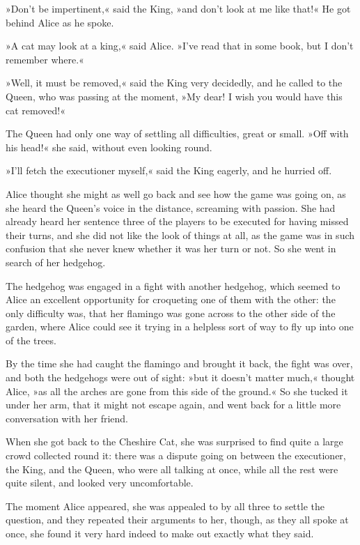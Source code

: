 »Don't be impertinent,« said the King, »and don't look at me like that!« He got behind Alice as he spoke.

»A cat may look at a king,« said Alice. »I've read that in some book, but I don't remember where.«

»Well, it must be removed,« said the King very decidedly, and he called to the Queen, who was passing at the moment, »My dear! I wish you would have this cat removed!«

The Queen had only one way of settling all difficulties, great or small. »Off with his head!« she said, without even looking round.

»I'll fetch the executioner myself,« said the King eagerly, and he hurried off.

Alice thought she might as well go back and see how the game was going on, as she heard the Queen's voice in the distance, screaming with passion. She had already heard her sentence three of the players to be executed for having missed their turns, and she did not like the look of things at all, as the game was in such confusion that she never knew whether it was her turn or not. So she went in search of her hedgehog.

The hedgehog was engaged in a fight with another hedgehog, which seemed to Alice an excellent opportunity for croqueting one of them with the other: the only difficulty was, that her flamingo was gone across to the other side of the garden, where Alice could see it trying in a helpless sort of way to fly up into one of the trees.

By the time she had caught the flamingo and brought it back, the fight was over, and both the hedgehogs were out of sight: »but it doesn't matter much,« thought Alice, »as all the arches are gone from this side of the ground.« So she tucked it under her arm, that it might not escape again, and went back for a little more conversation with her friend.

When she got back to the Cheshire Cat, she was surprised to find quite a large crowd collected round it: there was a dispute going on between the executioner, the King, and the Queen, who were all talking at once, while all the rest were quite silent, and looked very uncomfortable.

The moment Alice appeared, she was appealed to by all three to settle the question, and they repeated their arguments to her, though, as they all spoke at once, she found it very hard indeed to make out exactly what they said.

